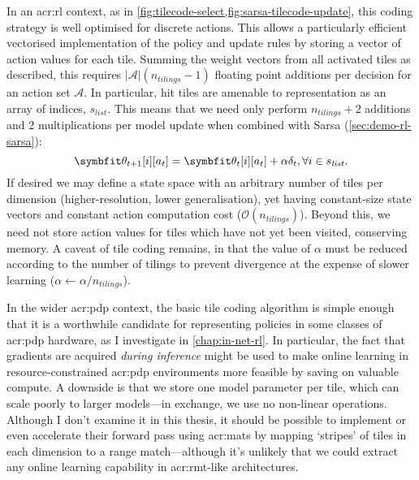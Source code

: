 In an \gls{acr:rl} context, as in \cref{fig:tilecode-select,fig:sarsa-tilecode-update}, this coding strategy is well optimised for discrete actions.
This allows a particularly efficient vectorised implementation of the policy and update rules by storing a vector of action values for each tile.
Summing the weight vectors from all activated tiles as described, this requires  $|\mathcal{A}|(n_{\mathit{tilings}}-1)$ floating point additions per decision for an action set $\mathcal{A}$.
In particular, hit tiles are amenable to representation as an array of indices, $s_{\mathit{list}}$.
This means that we need only perform $n_{\mathit{tilings}} + 2$ additions and \num{2} multiplications per model update when combined with Sarsa (\cref{sec:demo-rl-sarsa}):
\begin{equation}
	\wvec{t+1}[i][a_t] = \wvec{t}[i][a_t] + \alpha \delta_t, \forall i \in s_{\mathit{list}}.
	\label{eqn:sg-sarsa-opt}
\end{equation}
If desired we may define a state space with an arbitrary number of tiles per dimension (higher-resolution, lower generalisation), yet having constant-size state vectors and constant action computation cost ($\mathcal{O}(n_{\mathit{tilings}})$).
Beyond this, we need not store action values for tiles which have not yet been visited, conserving memory.
A caveat of tile coding remains, in that the value of $\alpha$ must be reduced according to the number of tilings to prevent divergence at the expense of slower learning ($\alpha \leftarrow \alpha / n_{\mathit{tilings}}$).

In the wider \gls{acr:pdp} context, the basic tile coding algorithm is simple enough that it is a worthwhile candidate for representing policies in some classes of \gls{acr:pdp} hardware, as I investigate in \cref{chap:in-net-rl}.
In particular, the fact that gradients are acquired \emph{during inference} might be used to make online learning in resource-constrained \gls{acr:pdp} environments more feasible by saving on valuable compute.
A downside is that we store one model parameter per tile, which can scale poorly to larger models---in exchange, we use no non-linear operations.
Although I don't examine it in this thesis, it should be possible to implement or even accelerate their forward pass using \glspl{acr:mat} by mapping `stripes' of tiles in each dimension to a range match---although it's unlikely that we could extract any online learning capability in \gls{acr:rmt}-like architectures.

